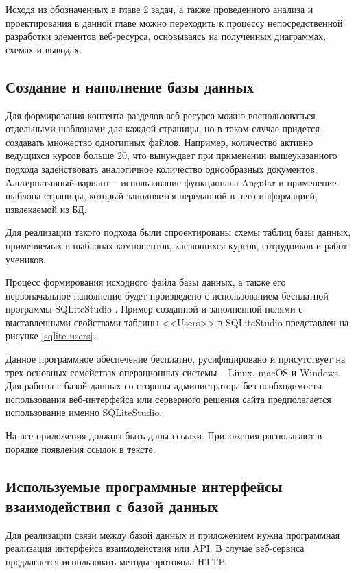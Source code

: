 Исходя из обозначенных в главе 2 задач, а также проведенного анализа и проектирования в данной главе можно переходить к процессу непосредственной разработки элементов веб-ресурса, основываясь на полученных диаграммах, схемах и выводах.


\subsection{Создание и наполнение базы данных}

Для формирования контента разделов веб-ресурса можно воспользоваться отдельными шаблонами для каждой страницы, но в таком случае придется создавать множество однотипных файлов.
Например, количество активно ведущихся курсов больше 20, что вынуждает при применении вышеуказанного подхода задействовать аналогичное количество однообразных документов.
Альтернативный вариант -- использование функционала Angular и применение шаблона страницы, который заполняется переданной в него информацией, извлекаемой из БД.

Для реализации такого подхода были спроектированы схемы таблиц базы данных, применяемых в шаблонах компонентов, касающихся курсов, сотрудников и работ учеников.

Процесс формирования исходного файла базы данных, а также его первоначальное наполнение будет произведено с использованием бесплатной программы SQLiteStudio \cite{sqlitestudio}.
Пример созданной и заполненной полями с выставленными свойствами таблицы <<Users>> в SQLiteStudio представлен на рисунке \ref{sqlite-users}.

Данное программное обеспечение бесплатно, русифицировано и присутствует на трех основных семействах операционных системы -- Linux, macOS и Windows.
Для работы с базой данных со стороны администратора без необходимости использования веб-интерфейса или серверного решения сайта предполагается использование именно SQLiteStudio.

На все приложения должны быть даны ссылки. Приложения располагают в порядке
появления ссылок в тексте.
\subsection{Используемые программные интерфейсы взаимодействия с базой данных}

Для реализации связи между базой данных и приложением нужна программная реализация интерфейса взаимодействия или API.
В случае веб-сервиса предлагается использовать методы протокола HTTP.

